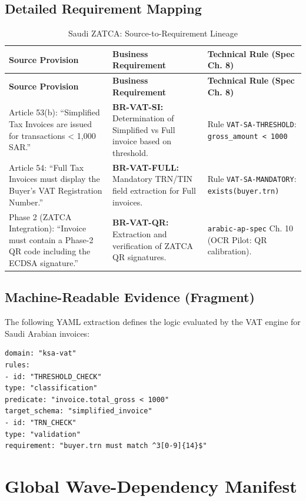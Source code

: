 \documentclass[11pt,a4paper,twoside]{report}
\begin{document}
\section{Detailed Requirement Mapping}

\begin{longtable}{p{5cm} p{5cm} p{5cm}}
\caption{Saudi ZATCA: Source-to-Requirement Lineage} \\
\toprule
\textbf{Source Provision} & \textbf{Business Requirement} & \textbf{Technical Rule (Spec Ch. 8)} \\
\midrule
\endfirsthead
\toprule
\textbf{Source Provision} & \textbf{Business Requirement} & \textbf{Technical Rule (Spec Ch. 8)} \\
\midrule
\endhead
Article 53(b): ``Simplified Tax Invoices are issued for transactions < 1,000 SAR.'' & \textbf{BR-VAT-SI:} Determination of Simplified vs Full invoice based on threshold. & Rule \texttt{VAT-SA-THRESHOLD}: \texttt{gross\_amount < 1000} \\
\midrule
Article 54: ``Full Tax Invoices must display the Buyer's VAT Registration Number.'' & \textbf{BR-VAT-FULL:} Mandatory TRN/TIN field extraction for Full invoices. & Rule \texttt{VAT-SA-MANDATORY}: \texttt{exists(buyer.trn)} \\
\midrule
Phase 2 (ZATCA Integration): ``Invoice must contain a Phase-2 QR code including the ECDSA signature.'' & \textbf{BR-VAT-QR:} Extraction and verification of ZATCA QR signatures. & \texttt{arabic-ap-spec} Ch. 10 (OCR Pilot: QR calibration). \\
\bottomrule
\end{longtable}

\section{Machine-Readable Evidence (Fragment)}
The following YAML extraction defines the logic evaluated by the VAT engine for Saudi Arabian invoices:

\begin{lstlisting}[language=yamlx]
domain: "ksa-vat"
rules:
- id: "THRESHOLD_CHECK"
type: "classification"
predicate: "invoice.total_gross < 1000"
target_schema: "simplified_invoice"
- id: "TRN_CHECK"
type: "validation"
requirement: "buyer.trn must match ^3[0-9]{14}$"
\end{lstlisting}

\chapter{Global Wave-Dependency Manifest}
\label{ch:global-dependencies}
\end{document}
